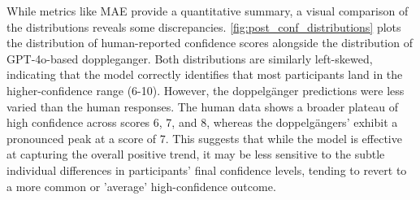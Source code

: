 While metrics like MAE provide a quantitative summary, a visual comparison of the distributions reveals some discrepancies. \cref{fig:post_conf_distributions} plots the distribution of human-reported confidence scores alongside the distribution of GPT-4o-based doppleganger. Both distributions are similarly left-skewed, indicating that the model correctly identifies that most participants land in the higher-confidence range (6-10). However, the doppelgänger predictions were less varied than the human responses. The human data shows a broader plateau of high confidence across scores 6, 7, and 8, whereas the doppelgängers' exhibit a pronounced peak at a score of 7. This suggests that while the model is effective at capturing the overall positive trend, it may be less sensitive to the subtle individual differences in participants' final confidence levels, tending to revert to a more common or 'average' high-confidence outcome.



